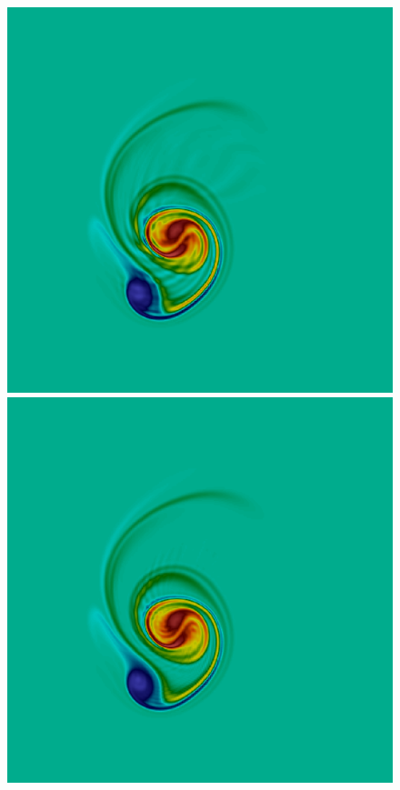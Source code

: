 \begin{figure}[h!]
\includegraphics[scale=0.06]{data/Incompressible_Euler/Snapshots/red_17_5.png}\hspace{1em}
\includegraphics[scale=0.06]{data/Incompressible_Euler/Snapshots/red_35_5.png}\hspace{1em}

\end{figure}
